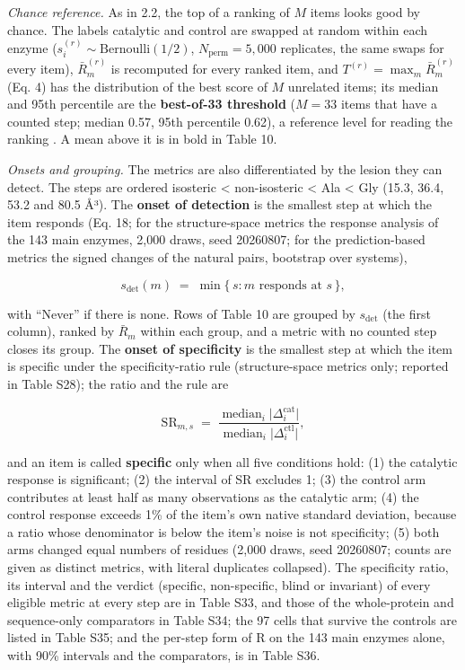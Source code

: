 \documentclass[
  10pt,
]{article}
\DeclareRobustCommand{\_}{\textunderscore\hspace{0pt}}
\begin{document}
\emph{Chance
reference.} As in
2.2, the top of a
ranking of \(M\)
items looks good by
chance. The labels
catalytic and
control are swapped
at random within
each enzyme
(\(s_i^{(r)} \sim \mathrm{Bernoulli}(1/2)\),
\(N_{\mathrm{perm}} = 5{,}000\)
replicates, the same
swaps for every
item),
\(\bar R^{(r)}_m\)
is recomputed for
every ranked item,
and
\(T^{(r)} = \max_m \bar R^{(r)}_m\)
(Eq. 4) has the
distribution of the
best score of \(M\)
unrelated items; its
median and 95th
percentile are the
\textbf{best-of-33
threshold}
(\(M = 33\) items
that have a counted
step; median 0.57,
95th percentile
0.62), a reference
level for reading
the ranking
\cite{westfall1993}.
A mean above it is
in bold in Table 10.

\emph{Onsets and
grouping.} The
metrics are also
differentiated by
the lesion they can
detect. The steps
are ordered
isosteric
\textless{}
non-isosteric
\textless{} Ala
\textless{} Gly
(15.3, 36.4, 53.2
and 80.5 Å³). The
\textbf{onset of
detection} is the
smallest step at
which the item
responds (Eq. 18;
for the
structure-space
metrics the response
analysis of the 143
main enzymes, 2,000
draws, seed
20260807; for the
prediction-based
metrics the signed
changes of the
natural pairs,
bootstrap over
systems),

\begin{equation*}s_{\mathrm{det}}(m) \;=\; \min\{\,s : m \text{ responds at } s\,\}, \tag{21}\end{equation*}

with ``Never'' if
there is none. Rows
of Table 10 are
grouped by
\(s_{\mathrm{det}}\)
(the first column),
ranked by
\(\bar R_m\) within
each group, and a
metric with no
counted step closes
its group. The
\textbf{onset of
specificity} is the
smallest step at
which the item is
specific under the
specificity-ratio
rule
(structure-space
metrics only;
reported in Table
S28); the ratio and
the rule are

\begin{equation*}\mathrm{SR}_{m,s} \;=\; \frac{\operatorname{median}_i \lvert\Delta^{\mathrm{cat}}_{i}\rvert}{\operatorname{median}_i \lvert\Delta^{\mathrm{ctl}}_{i}\rvert}, \tag{22}\end{equation*}

and an item is
called
\textbf{specific}
only when all five
conditions hold: (1)
the catalytic
response is
significant; (2) the
interval of SR
excludes 1; (3) the
control arm
contributes at least
half as many
observations as the
catalytic arm; (4)
the control response
exceeds 1\% of the
item's own native
standard deviation,
because a ratio
whose denominator is
below the item's
noise is not
specificity; (5)
both arms changed
equal numbers of
residues (2,000
draws, seed
20260807; counts are
given as distinct
metrics, with
literal duplicates
collapsed). The
specificity ratio,
its interval and the
verdict (specific,
non-specific, blind
or invariant) of
every eligible
metric at every step
are in Table S33,
and those of the
whole-protein and
sequence-only
comparators in Table
S34; the 97 cells
that survive the
controls are listed
in Table S35; and
the per-step form of
R on the 143 main
enzymes alone, with
90\% intervals and
the comparators, is
in Table S36.
\end{document}
